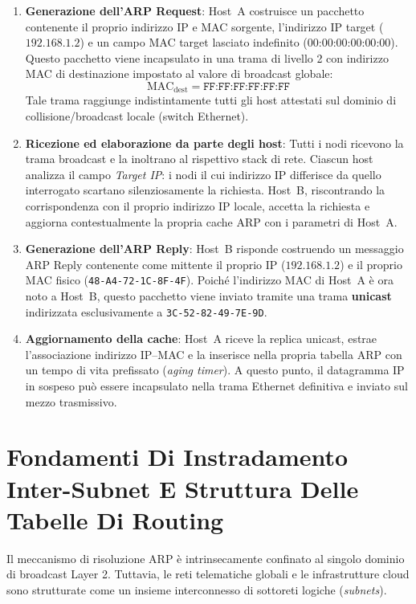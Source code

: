 \documentclass[11pt, a4paper]{article}
\begin{document}
\begin{enumerate}
    \item \textbf{Generazione dell'ARP Request}: Host~A costruisce un pacchetto contenente il proprio indirizzo IP e MAC sorgente, l'indirizzo IP target ($192.168.1.2$) e un campo MAC target lasciato indefinito ($00\text{:}00\text{:}00\text{:}00\text{:}00\text{:}00$). Questo pacchetto viene incapsulato in una trama di livello 2 con indirizzo MAC di destinazione impostato al valore di broadcast globale:
    \[
        \text{MAC}_{\text{dest}} = \texttt{FF:FF:FF:FF:FF:FF}
    \]
    Tale trama raggiunge indistintamente tutti gli host attestati sul dominio di collisione/broadcast locale (switch Ethernet).

    \item \textbf{Ricezione ed elaborazione da parte degli host}: Tutti i nodi ricevono la trama broadcast e la inoltrano al rispettivo stack di rete. Ciascun host analizza il campo \emph{Target IP}: i nodi il cui indirizzo IP differisce da quello interrogato scartano silenziosamente la richiesta. Host~B, riscontrando la corrispondenza con il proprio indirizzo IP locale, accetta la richiesta e aggiorna contestualmente la propria cache ARP con i parametri di Host~A.

    \item \textbf{Generazione dell'ARP Reply}: Host~B risponde costruendo un messaggio ARP Reply contenente come mittente il proprio IP ($192.168.1.2$) e il proprio MAC fisico (\texttt{48-A4-72-1C-8F-4F}). Poiché l'indirizzo MAC di Host~A è ora noto a Host~B, questo pacchetto viene inviato tramite una trama \textbf{unicast} indirizzata esclusivamente a \texttt{3C-52-82-49-7E-9D}.

    \item \textbf{Aggiornamento della cache}: Host~A riceve la replica unicast, estrae l'associazione indirizzo IP--MAC e la inserisce nella propria tabella ARP con un tempo di vita prefissato (\emph{aging timer}). A questo punto, il datagramma IP in sospeso può essere incapsulato nella trama Ethernet definitiva e inviato sul mezzo trasmissivo.
\end{enumerate}

\newpage

\section{Fondamenti Di Instradamento Inter-Subnet E Struttura Delle Tabelle Di Routing}

Il meccanismo di risoluzione ARP è intrinsecamente confinato al singolo dominio di broadcast Layer 2. Tuttavia, le reti telematiche globali e le infrastrutture cloud sono strutturate come un insieme interconnesso di sottoreti logiche (\emph{subnets}).
\end{document}
